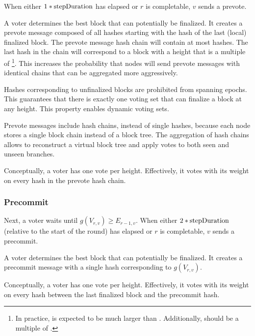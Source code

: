 When either $1 * \nemsetting{finalization}{stepDuration}$ has elapsed or $r$ is completable, $v$ sends a prevote.

A voter determines the best block that can potentially be finalized.
It creates a prevote message composed of all hashes starting with the hash of the last (local) finalized block.
The prevote message hash chain will contain at most  hashes.
The last hash in the chain will correspond to a block with a height that is a multiple of \footnote{
	In practice,  is expected to be much larger than .
	Additionally,  should be a multiple of .
}.
This increases the probability that nodes will send prevote messages with identical chains that can be aggregated more aggressively.

Hashes corresponding to unfinalized blocks are prohibited from spanning epochs.
This guarantees that there is exactly one voting set that can finalize a block at any height.
This property enables dynamic voting sets.

Prevote messages include hash chains, instead of single hashes, because each \codenamespace node stores a single block chain instead of a block tree.
The aggregation of hash chains allows \codenamespace to reconstruct a virtual block tree and apply votes to both seen and unseen branches.

Conceptually, a voter has one vote per height.
Effectively, it votes with its weight on every hash in the prevote hash chain.

\subsubsection{Precommit}

Next, a voter waits until $g(V_{r,v}) \geq E_{r-1,v}$.
When either $2 * \nemsetting{finalization}{stepDuration}$ (relative to the start of the round) has elapsed or $r$ is completable, $v$ sends a precommit.

A voter determines the best block that can potentially be finalized.
It creates a precommit message with a single hash corresponding to $g(V_{r,v})$.

Conceptually, a voter has one vote per height.
Effectively, it votes with its weight on every hash between the last finalized block and the precommit hash.

